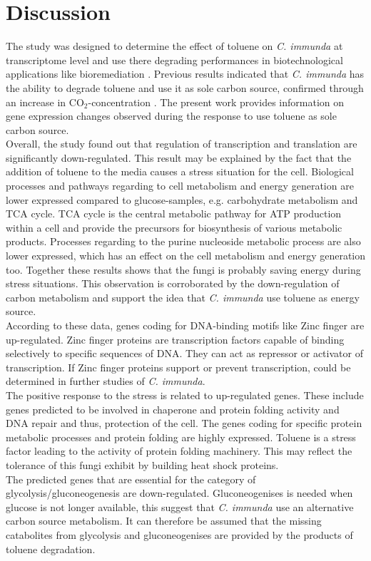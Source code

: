 \documentclass[12pt, a4paper]{report}
\begin{document}
\chapter*{Discussion}
The study was designed to determine the effect of toluene on \textit{C. immunda} at transcriptome level and use there degrading performances in biotechnological applications like bioremediation \cite{BarbaraBlasi2015}. Previous results indicated that \textit{C. immunda} has the ability to degrade toluene and use it as sole carbon source, confirmed through an increase in CO$_2$-concentration \cite{Poyntner2014}. The present work provides information on gene expression changes observed during the response to use toluene as sole carbon source.\\
Overall, the study found out that regulation of transcription and translation are significantly down-regulated. This result may be explained by the fact that the addition of toluene to the media causes a stress situation for the cell. Biological processes and pathways regarding to cell metabolism and energy generation are lower expressed compared to glucose-samples, e.g. carbohydrate metabolism and TCA cycle. TCA cycle is the central metabolic pathway for ATP production within a cell and provide the precursors for biosynthesis of various metabolic products. Processes regarding to the purine nucleoside metabolic process are also lower expressed, which has an effect on the cell metabolism and energy generation too. Together these results shows that the fungi is probably saving energy during stress situations. This observation is corroborated by the down-regulation of carbon metabolism and support the idea that \textit{C. immunda} use toluene as energy source. \\
According to these data, genes coding for DNA-binding motifs like Zinc finger are up-regulated. Zinc finger proteins are transcription factors capable of binding selectively to specific sequences of DNA. They can act as repressor or activator of transcription. If Zinc finger proteins support or prevent transcription, could be determined in further studies of \textit{C. immunda}. \\
The positive response to the stress is related to up-regulated genes. These include genes predicted to be involved in chaperone and protein folding activity and DNA repair and thus, protection of the cell. The genes coding for specific protein metabolic processes and protein folding are highly expressed. Toluene is a stress factor leading to the activity of protein folding machinery. This may reflect the tolerance of this fungi exhibit by building heat shock proteins. \\
The predicted genes that are essential for the category of glycolysis/gluconeogenesis are down-regulated. 
Gluconeogenises is needed when glucose is not longer available, this suggest that \textit{C. immunda} use an alternative carbon source metabolism. It can therefore be assumed that the missing catabolites from glycolysis and gluconeogenises are provided by the products of toluene degradation.\\
\end{document}
